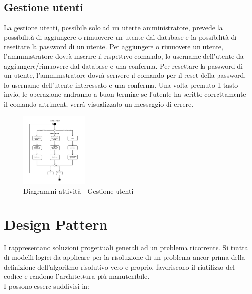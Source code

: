 \documentclass{scalatekids-article}
\begin{document}
\subsection{Gestione utenti}

La gestione utenti, possibile solo ad un utente amministratore, prevede la
possibilità di aggiungere o rimuovere un utente dal database e la possibilità
di resettare la password di un utente. Per aggiungere o rimuovere un utente,
l'amministratore dovrà inserire il rispettivo comando, lo username dell'utente
da aggiungere/rimuovere dal database e una conferma. Per resettare la password
di un utente, l'amministratore dovrà scrivere il comando per il reset della
password, lo username dell'utente interessato e una conferma. Una volta
premuto il tasto invio, le operazione andranno a buon termine se l'utente ha
scritto correttamente il comando altrimenti verrà visualizzato un messaggio di
errore.

\begin{figure}[H]
  \begin{center}
    \includegraphics[width=0.3\textwidth, keepaspectratio]{img/diagrammiAttivita/gestioneUtenti.jpeg}
    \caption{Diagrammi attività - Gestione utenti}
  \end{center}
\end{figure}

\section{Design Pattern}

I  rappresentano soluzioni progettuali generali ad un
problema ricorrente. Si tratta di  modelli logici da applicare per la
risoluzione di un problema ancor prima della definizione dell'algoritmo
risolutivo vero e proprio, favoriscono il riutilizzo del codice e rendono
l'architettura più manutenibile.\\
I  possono essere suddivisi in:
\end{document}
